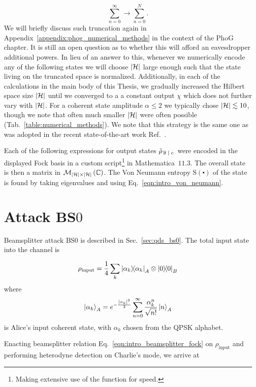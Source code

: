 \begin{equation}
\sum_{n=0}^\infty \rightarrow \sum_{n=0}^N.
\end{equation}
We will briefly discuss such truncation again in Appendix~\ref{appendix:phog_numerical_methods} in the context of the PhoG chapter. It is still an open question \cite{Lin2019} as to whether this will afford an eavesdropper additional powers. In lieu of an answer to this, whenever we numerically encode any of the following states we will choose $\left|\mathcal{H}\right|$ large enough such that the state living on the truncated space is normalized. Additionally, in each of the calculations in the main body of this Thesis, we gradually increased the Hilbert space size $\left|\mathcal{H}\right|$ until we converged to a a constant output $\chi$ which does not further vary with $\left|\mathcal{H}\right|$. For a coherent state amplitude $\alpha \le 2$ we typically chose $\left|\mathcal{H}\right| \lesssim 10$, though we note that often much smaller $\left|\mathcal{H}\right|$ were often possible (Tab.~\ref{table:numerical_methods}). We note that this strategy is the same one as was adopted in the recent state-of-the-art work Ref.~\cite{Lin2019}.

Each of the following expressions for output states $\tilde{\rho}_{\left. \mathbb{B} \; \middle| \; c\right.}$ were encoded in the displayed Fock basis in a custom script\footnote{Making extensive use of the  function for speed.} in Mathematica~$11.3$. The overall state is then a matrix in $\mathcal{M}_{\left|\mathcal{H}\right| \times \left|\mathcal{H}\right|}\left(\mathbb{C}\right)$. The Von Neumann entropy $\text{S}\left(\centerdot\right)$ of the state is found by taking eigenvalues and using Eq.~\ref{eqn:intro_von_neumann}.

\section{Attack BS$0$}
Beamsplitter attack BS$0$ is described in Sec.~\ref{sec:qds_bs0}. The total input state into the channel is

\begin{equation}
\rho_{\text{input}} = \frac{1}{4}\sum_k \dyad{\alpha_k}_A \otimes \dyad{0}_B
\end{equation}
where
\begin{equation}
\ket{\alpha_k}_A = e^{- \frac{\left| \alpha_k \right|^2}{2}} \sum_{n=0}^\infty \frac{\alpha_k^n}{\sqrt{n!}} \ket{n}_A
\end{equation}
is Alice's input coherent state, with $\alpha_k$ chosen from the QPSK alphabet. 

Enacting beamsplitter relation Eq.~\ref{eqn:intro_beamsplitter_fock} on $\rho_{\text{input}}$ and performing heterodyne detection on Charlie's mode, we arrive at

